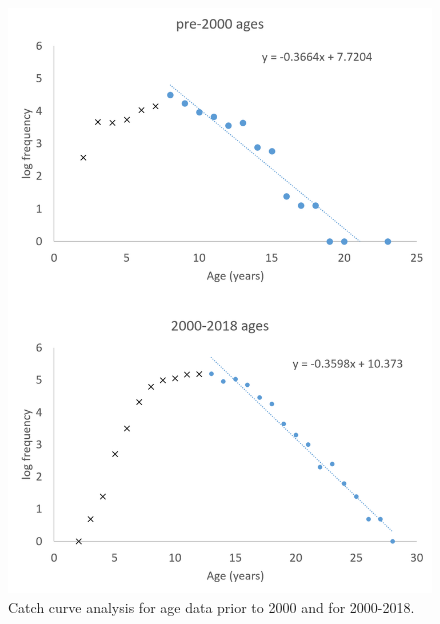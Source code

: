 \documentclass[12pt,]{article}
\begin{document}
\FloatBarrier

\begin{figure}
\centering
\includegraphics{Figures/STAR_request1.png}
\caption{Catch curve analysis for age data prior to 2000 and for
2000-2018. \label{fig:STAR_request1}}
\end{figure}

\FloatBarrier
\end{document}
